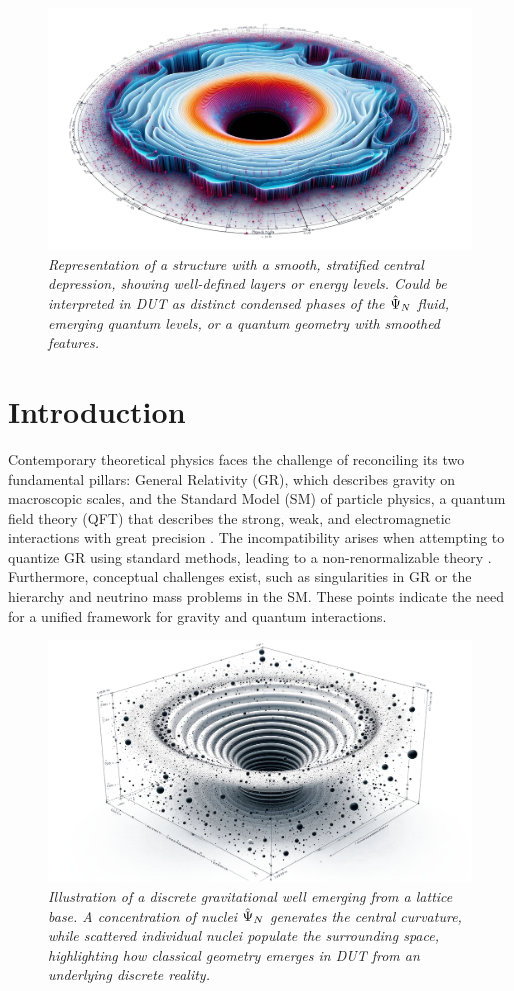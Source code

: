 \documentclass[11pt, a4paper]{article}
\theoremstyle{remark}
\newcommand{\Op}[1]{\hat{#1}}
\begin{document}
\begin{figure}[htbp]
    \centering
    \includegraphics[width=0.6\linewidth]{OIG24.ZNLJ.PNG}
    \caption{%
        \footnotesize\textit{Representation of a structure with a smooth, stratified central depression, showing well-defined layers or energy levels. Could be interpreted in DUT as distinct condensed phases of the \(\protect\Op{\Psi}_N\) fluid, emerging quantum levels, or a quantum geometry with smoothed features.}
    }
    \label{fig:Figura2}
\end{figure}

\hypertarget{toc}{}
\tableofcontents

\section{Introduction}
\label{sec:introduction_final_revised}

Contemporary theoretical physics faces the challenge of reconciling its two fundamental pillars: General Relativity (GR), which describes gravity on macroscopic scales, and the Standard Model (SM) of particle physics, a quantum field theory (QFT) that describes the strong, weak, and electromagnetic interactions with great precision \citep{PeskinSchroeder1995, WeinbergQFT1}. The incompatibility arises when attempting to quantize GR using standard methods, leading to a non-renormalizable theory \citep{tHooft1974, Weinberg1979}. Furthermore, conceptual challenges exist, such as singularities in GR or the hierarchy and neutrino mass problems in the SM. These points indicate the need for a unified framework for gravity and quantum interactions.

\begin{figure}[htbp]
    \centering
    \includegraphics[width=0.6\linewidth]{OIG29.ZNLJ.PNG}
    \caption{%
        \footnotesize\textit{Illustration of a discrete gravitational well emerging from a lattice base. A concentration of nuclei \(\protect\Op{\Psi}_N\) generates the central curvature, while scattered individual nuclei populate the surrounding space, highlighting how classical geometry emerges in DUT from an underlying discrete reality.}
    }
    \label{fig:Figura3}
\end{figure}
\end{document}
